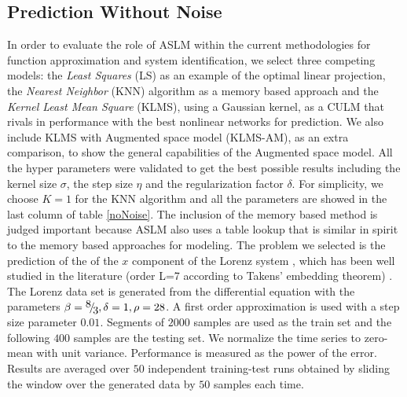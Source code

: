 \documentclass{article}
\begin{document}
\subsection{Prediction Without Noise}
In order to evaluate the role of ASLM within the current methodologies for function approximation and system identification, we select three competing models: the \textit{Least Squares} (LS) as an example of the optimal linear projection, the \textit{Nearest Neighbor} (KNN) algorithm \cite{Cover1967Nearest} as a memory based approach and the \textit{Kernel Least Mean Square} (KLMS), using a Gaussian kernel, as a CULM that rivals in performance with the best nonlinear networks for prediction. We also include KLMS with Augmented space model (KLMS-AM), as an extra comparison, to show the general capabilities of the Augmented space model. All the hyper parameters were validated to get the best possible results including the kernel size $ \sigma $, the step size $ \eta $ and the regularization factor $ \delta $.  For simplicity, we choose $ K=1 $ for the KNN algorithm and all the parameters are showed in the last column of table \ref{noNoise}. The inclusion of the memory based method is judged important because ASLM also uses a table lookup that is similar in spirit to the memory based approaches for modeling. The problem we selected is the prediction of the of the $ x $ component of the Lorenz system \cite{liu2011kernel}, which has been well studied in the literature (order L=7 according to Takens’ embedding theorem) \cite{lorenz1963deterministic}. The Lorenz data set is generated from the differential equation with the parameters $ \beta={\raise0.7ex\hbox{$8$} \!\mathord{\left/	{\vphantom {8 3}}\right.\kern-\nulldelimiterspace}\!\lower0.7ex\hbox{$3$}}, \delta=1,\rho=28 $. A first order approximation is used with a step size parameter $ 0.01 $. Segments of $ 2000 $ samples are used as the train set and the following $ 400 $ samples are the testing set. We normalize the time series to zero-mean with unit variance. Performance is measured as the power of the error. Results are averaged over $ 50 $ independent training-test runs obtained by sliding the window over the generated data by $ 50 $ samples each time. 
\vspace{-2mm}
\end{document}
